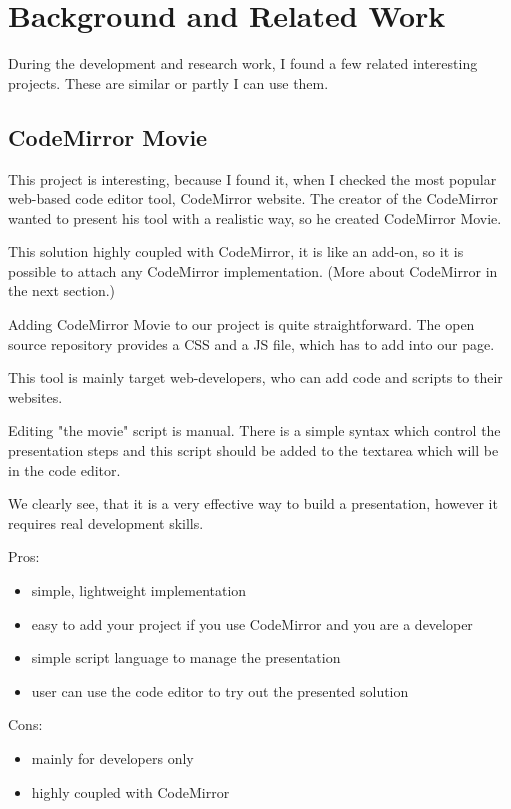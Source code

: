 \chapter{Background and Related Work}

During the development and research work, I found a few related interesting projects. These are similar or partly I can use them.

\section{CodeMirror Movie}

This project is interesting, because I found it, when I checked the most popular web-based code editor tool, CodeMirror website. The creator of the CodeMirror wanted to present his tool with a realistic way, so he created CodeMirror Movie. \cite{cm-movie}

This solution highly coupled with CodeMirror, it is like an add-on, so it is possible to attach any CodeMirror implementation. (More about CodeMirror in the next section.)

Adding CodeMirror Movie to our project is quite straightforward. The open source repository provides a CSS and a JS file, which has to add into our page.

This tool is mainly target web-developers, who can add code and scripts to their websites.

Editing "the movie" script is manual. There is a simple syntax which control the presentation steps and this script should be added to the textarea which will be in the code editor.

We clearly see, that it is a very effective way to build a presentation, however it requires real development skills.

Pros:
\begin{itemize}
\item simple, lightweight implementation
\item easy to add your project if you use CodeMirror and you are a developer
\item simple script language to manage the presentation
\item user can use the code editor to try out the presented solution
\end{itemize}
Cons:
\begin{itemize}
\item mainly for developers only
\item highly coupled with CodeMirror
\end{itemize}


